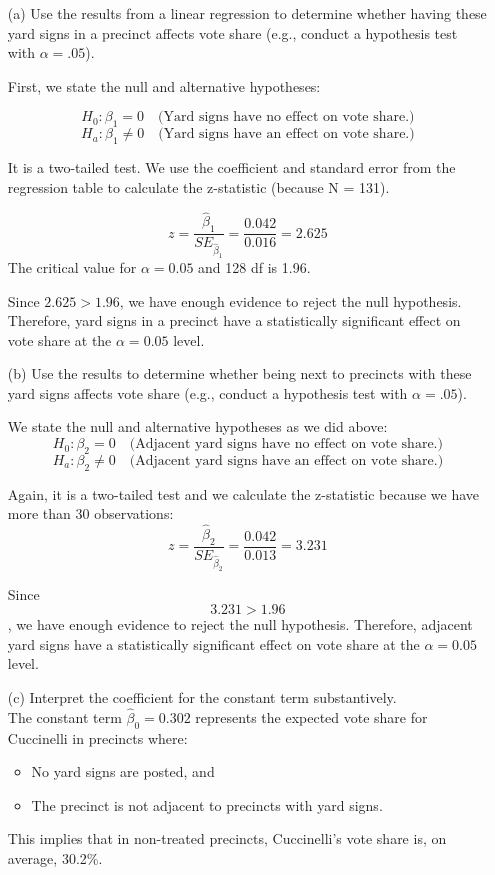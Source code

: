 \documentclass[12pt,letterpaper]{article}
\begin{document}
\vspace{.5cm}
\begin{enumerate}
	\item [(a)] Use the results from a linear regression to determine whether having these yard signs in a precinct affects vote share (e.g., conduct a hypothesis test with $\alpha = .05$).
	
	First, we state the null and alternative hypotheses: 

	$$
	H_0: \beta_1 = 0 \quad \text{(Yard signs have no effect on vote share.)}$$
	$$
	H_a: \beta_1 \neq 0 \quad \text{(Yard signs have an effect on vote share.)}
	$$
	
	It is a two-tailed test. We use the coefficient and standard error from the regression table to calculate the z-statistic (because N = 131).
	
	$$
	z = \frac{\hat{\beta}_1}{SE_{\hat{\beta}_1}} = \frac{0.042}{0.016} = 2.625
	$$
	The critical value for $\alpha = 0.05$ and 128 df is 1.96.
	
	Since $2.625 > 1.96$, we have enough evidence to reject the null hypothesis. Therefore, yard signs in a precinct have a statistically significant effect on vote share at the \(\alpha = 0.05\) level.
	
	\item [(b)]  Use the results to determine whether being
	next to precincts with these yard signs affects vote
	share (e.g., conduct a hypothesis test with $\alpha = .05$).
	
	We state the null and alternative hypotheses as we did above: 
	$$
	H_0: \beta_2 = 0 \quad \text{(Adjacent yard signs have no effect on vote share.)}
	$$
	$$
	H_a: \beta_2 \neq 0 \quad \text{(Adjacent yard signs have an effect on vote share.)}
	$$
	
	Again, it is a two-tailed test and we calculate the z-statistic because we have more than 30 observations: 
	$$z = \frac{\hat{\beta}_2}{SE_{\hat{\beta}_2}} = \frac{0.042}{0.013} = 3.231
	$$
	
	Since $$3.231 > 1.96$$, we have enough evidence to reject the null hypothesis.  Therefore, adjacent yard signs have a statistically significant effect on vote share at the \(\alpha = 0.05\) level.
	

	\item [(c)] Interpret the coefficient for the constant term substantively.\\
	The constant term $\hat{\beta}_0 = 0.302$ represents the expected vote share for Cuccinelli in precincts where: 
	\begin{itemize}
		\item No yard signs are posted, and
		\item The precinct is not adjacent to precincts with yard signs.
	\end{itemize}
	This implies that in non-treated precincts, Cuccinelli's vote share is, on average, 30.2\%.
	

\end{enumerate}
\end{document}
